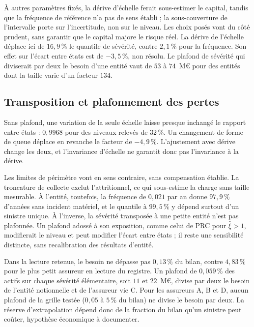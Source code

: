 \vspace{4pt}
\noindent À autres paramètres fixés, la dérive d'échelle ferait sous-estimer le capital, tandis que la fréquence de référence n'a pas de sens établi ; la sous-couverture de l'intervalle porte sur l'incertitude, non sur le niveau. Les choix posés vont du côté prudent, sans garantir que le capital majore le risque réel. La dérive de l'échelle
déplace ici de $16{,}9\,\%$ le quantile de sévérité, contre $2{,}1\,\%$ pour la fréquence. Son effet sur l'écart
entre états est de $-3{,}5\,\%$, non résolu. Le plafond de sévérité qui diviserait par deux le besoin d'une entité vaut de $53$ à $74$~M\euro{}
pour des entités dont la taille varie d'un facteur $134$.


\subsection{Transposition et plafonnement des pertes}
\label{sec:registre-limites-detail}

Sans plafond, une variation de la seule échelle laisse presque inchangé le rapport entre états : $0{,}9968$ pour des
niveaux relevés de $32\,\%$. Un changement de forme de queue déplace en revanche le facteur de
$-4{,}9\,\%$. L'ajustement avec dérive change les deux, et l'invariance d'échelle ne garantit donc pas
l'invariance à la dérive.

Les limites de périmètre vont en sens contraire, sans compensation établie. La troncature de
collecte exclut l'attritionnel, ce qui sous-estime la charge sans taille mesurable. À l'entité,
toutefois, la fréquence de $0{,}021$ par an donne $97{,}9\,\%$ d'années sans incident matériel, et
le quantile à $99{,}5\,\%$ y dépend surtout d'un sinistre unique. À l'inverse, la sévérité
transposée à une petite entité n'est pas plafonnée. Un plafond adossé à son exposition, comme celui
de PRC pour $\hat\xi>1$, modifierait le niveau et peut modifier l'écart entre états ; il reste une
sensibilité distincte, sans recalibration des résultats d'entité.

Dans la lecture retenue, le besoin ne dépasse pas $0{,}13\,\%$ du bilan, contre $4{,}83\,\%$ pour le plus
petit assureur en lecture du registre. Un plafond de $0{,}059\,\%$ des actifs sur chaque sévérité élémentaire,
soit $11$ et $22$~M\euro, divise par deux le besoin de l'entité notionnelle et de l'assureur vie C. Pour les
assureurs A, B et D, aucun plafond de la grille testée ($0{,}05$ à $5\,\%$ du bilan) ne divise le besoin par deux. La réserve d'extrapolation
dépend donc de la fraction du bilan qu'un sinistre peut coûter, hypothèse économique à documenter.

